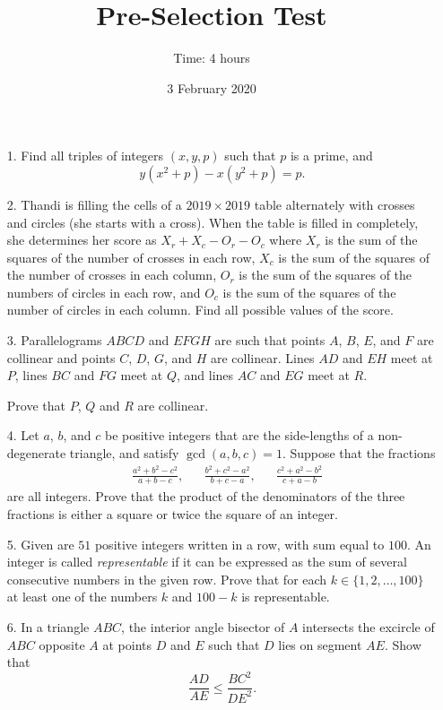 \documentclass{article}
\title{Pre-Selection Test}
\author{Time: 4 hours}
\date{3 February 2020}
\begin{document}
 \maketitle
\thispagestyle{empty}
\vfill
\begin{enumerate}

\item[1.] %
	Find all triples of integers $(x, y, p)$ such that $p$ is a prime, and
	\[
			y(x^2 + p) - x(y^2 + p) = p.
	\]


\item[2.] %
	Thandi is filling the cells of a $2019 \times 2019$ table alternately with crosses and circles (she starts with a cross).
	When the table is filled in completely, she determines her score as $X_r+X_c-O_r-O_c$ where $X_r$ is the sum of the squares of the number of crosses in each row, $X_c$ is the sum of the squares of the number of crosses in each column, $O_r$ is the sum of the squares of the numbers of circles in each row, and $O_c$ is the sum of the squares of the number of circles in each column.
	Find all possible values of the score.


\item[3.] %
	Parallelograms $ABCD$ and $EFGH$ are such that points $A$, $B$, $E$, and $F$ are collinear and points $C$, $D$, $G$, and $H$ are collinear.
	Lines $AD$ and $EH$ meet at $P$, lines $BC$ and $FG$ meet at $Q$, and lines $AC$ and $EG$ meet at $R$.

	Prove that $P$, $Q$ and $R$ are collinear.


\item[4.] %
	Let $a$, $b$, and $c$ be positive integers that are the side-lengths of a non-degenerate triangle, and satisfy $\gcd(a, b, c) = 1$.
	Suppose that the fractions
	\begin{align*}
		& \frac{a^2 + b^2 - c^2}{a + b - c}, && \frac{b^2 + c^2 - a^2}{b + c - a}, && \frac{c^2 + a^2 - b^2}{c + a - b}
	\end{align*}
	are all integers.
	Prove that the product of the denominators of the three fractions is either a square or twice the square of an integer.


\item[5.] %
	Given are $51$ positive integers written in a row, with sum equal to $100$.
	An integer is called \emph{representable} if it can be expressed as the sum of several consecutive numbers in the given row.
	Prove that for each $k \in \{1, 2, \dotsc, 100\}$ at least one of the numbers $k$ and $100-k$ is representable.


\item[6.] %
	In a triangle $ABC$, the interior angle bisector of $A$ intersects the excircle of $ABC$ opposite $A$ at points $D$ and $E$ such that $D$ lies on segment $AE$. Show that
	\[
		\frac{AD}{AE} \leq \frac{BC^2}{DE^2}.
	\]


\end{enumerate}
\vfill
\end{document}
